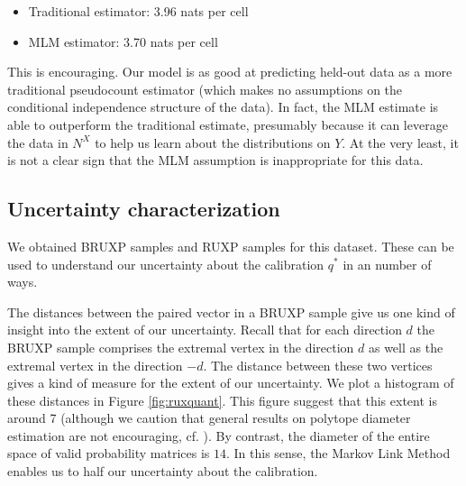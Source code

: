 \begin{itemize}
    \item Traditional estimator: 3.96 nats per cell
    \item MLM estimator: 3.70 nats per cell
\end{itemize}

This is encouraging.  Our model is as good at predicting held-out data as a more traditional pseudocount estimator (which makes no assumptions on the conditional independence structure of the data).  In fact, the MLM estimate is able to outperform the traditional estimate, presumably because it can leverage the data in $N^X$ to help us learn about the distributions on $Y$.  At the very least, it is not a clear sign that the MLM assumption is inappropriate for this data.

\subsection{Uncertainty characterization}

We obtained BRUXP samples and RUXP samples for this dataset.  These can be used to understand our uncertainty about the calibration $q^*$ in an number of ways.


The distances between the paired vector in a BRUXP sample give us one kind of insight into the extent of our uncertainty.  Recall that for each direction $d$ the BRUXP sample comprises the extremal vertex in the direction $d$ as well as the extremal vertex in the direction $-d$.  The distance between these two vertices gives a kind of measure for the extent of our uncertainty.  We plot a histogram of these distances in Figure \ref{fig:ruxquant}.  This figure suggest that this extent is around 7 (although we caution that general results on polytope diameter estimation are not encouraging, cf. \citep{brieden1998approximation}).  By contrast, the diameter of the entire space of valid probability matrices is $14$.  In this sense, the Markov Link Method enables us to half our uncertainty about the calibration.  

